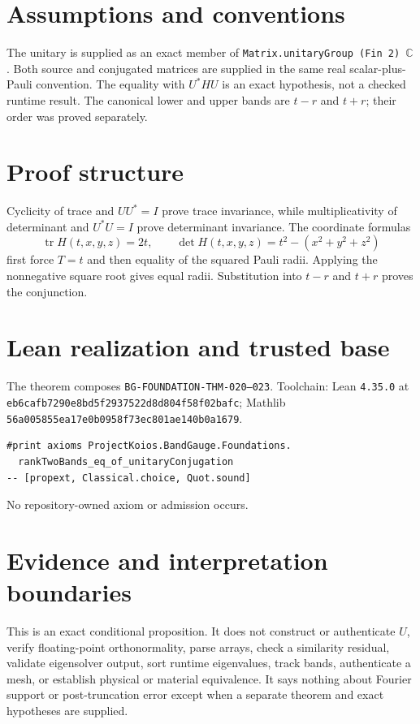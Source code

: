 \documentclass[10pt]{article}
\begin{document}
\section{Assumptions and conventions}
The unitary is supplied as an exact member of \texttt{Matrix.unitaryGroup (Fin 2) $\mathbb C$}.
Both source and conjugated matrices are supplied in the same real scalar-plus-Pauli convention.
The equality with $U^*HU$ is an exact hypothesis, not a checked runtime result. The canonical
lower and upper bands are $t-r$ and $t+r$; their order was proved separately.

\section{Proof structure}
Cyclicity of trace and $UU^*=I$ prove trace invariance, while multiplicativity of determinant and
$U^*U=I$ prove determinant invariance. The coordinate formulas
\[
 \operatorname{tr}H(t,x,y,z)=2t,
 \qquad \det H(t,x,y,z)=t^2-(x^2+y^2+z^2)
\]
first force $T=t$ and then equality of the squared Pauli radii. Applying the nonnegative square root
gives equal radii. Substitution into $t-r$ and $t+r$ proves the conjunction.

\section{Lean realization and trusted base}
The theorem composes \texttt{BG-FOUNDATION-THM-020--023}. Toolchain: Lean \texttt{4.35.0} at
\texttt{eb6cafb7290e8bd5f2937522d8d804f58f02bafc}; Mathlib
\texttt{56a005855ea17e0b0958f73ec801ae140b0a1679}.
\begin{verbatim}
#print axioms ProjectKoios.BandGauge.Foundations.
  rankTwoBands_eq_of_unitaryConjugation
-- [propext, Classical.choice, Quot.sound]
\end{verbatim}
No repository-owned axiom or admission occurs.

\section{Evidence and interpretation boundaries}
This is an exact conditional proposition. It does not construct or authenticate $U$, verify
floating-point orthonormality, parse arrays, check a similarity residual, validate eigensolver
output, sort runtime eigenvalues, track bands, authenticate a mesh, or establish physical or
material equivalence. It says nothing about Fourier support or post-truncation error except when a
separate theorem and exact hypotheses are supplied.
\end{document}
